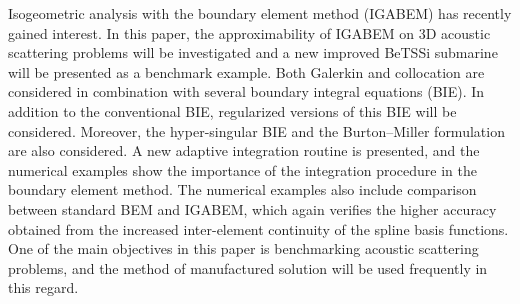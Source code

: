 Isogeometric analysis with the boundary element method (IGABEM) has recently gained interest. In this paper, the approximability of IGABEM on 3D acoustic scattering problems will be investigated and a new improved BeTSSi submarine will be presented as a benchmark example. Both Galerkin and collocation are considered in combination with several boundary integral equations (BIE). In addition to the conventional BIE, regularized versions of this BIE will be considered. Moreover, the hyper-singular BIE and the Burton--Miller formulation are also considered. A new adaptive integration routine is presented, and the numerical examples show the importance of the integration procedure in the boundary element method. The numerical examples also include comparison between standard BEM and IGABEM, which again verifies the higher accuracy obtained from the increased inter-element continuity of the spline basis functions. One of the main objectives in this paper is benchmarking acoustic scattering problems, and the method of manufactured solution will be used frequently in this regard.
